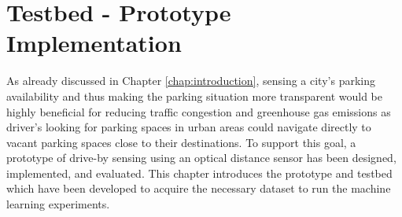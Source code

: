 \chapter{Testbed - Prototype Implementation}
\label{chap:referenceimplementation}

As already discussed in Chapter \ref{chap:introduction}, sensing a city's parking availability and thus making the parking situation more transparent would be highly beneficial for reducing traffic congestion and greenhouse gas emissions as driver's looking for parking spaces in urban areas could navigate directly to vacant parking spaces close to their destinations. To support this goal, a prototype of drive-by sensing using an optical distance sensor has been designed, implemented, and evaluated. This chapter introduces the prototype and testbed which have been developed to acquire the necessary dataset to run the machine learning experiments. 







